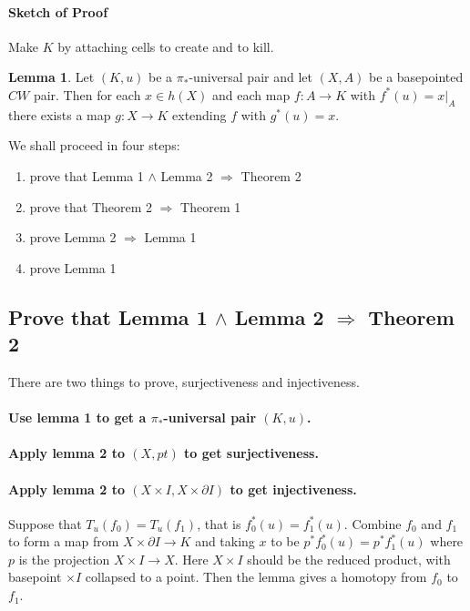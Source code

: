 \documentclass[11pt, oneside]{article}   	%
\theoremstyle{definition}
\newtheorem{lem}{Lemma}
\begin{document}
\paragraph{Sketch of Proof}

Make $K$ by attaching cells to create and to kill.

\begin{lem}
	Let $(K, u)$ be a $\pi_*$-universal pair and let $(X, A)$ be a basepointed $CW$ pair. Then for each $x\in h(X)$ and each map $f: A\to K$ with $f^*(u)=x|_A$ there exists a map $g:X\to K$ extending $f$ with $g^*(u)=x$.
\end{lem}

We shall proceed in four steps:
\begin{enumerate}[(1)]
	\item prove that Lemma 1 $\land$ Lemma 2 $\Rightarrow$ Theorem 2
	\item prove that Theorem 2 $\Rightarrow$ Theorem 1
	\item prove Lemma 2 $\Rightarrow$ Lemma 1
	\item prove Lemma 1
\end{enumerate}

\subsection{Prove that Lemma 1 $\land$ Lemma 2 $\Rightarrow$ Theorem 2}

There are two things to prove, surjectiveness and injectiveness.

\paragraph {Use lemma 1 to get a $\pi_*$-universal pair $(K,u)$.}

\paragraph {Apply lemma 2 to $(X, pt)$ to get surjectiveness.}

\paragraph {Apply lemma 2 to $(X\times I, X\times \partial I)$ to get injectiveness.}

Suppose that $T_u(f_0)=T_u(f_1)$, that is $f^*_0(u)=f^*_1(u)$. Combine $f_0$ and $f_1$ to form a map from $X\times \partial I\to K$ and taking $x$ to be $p^*f_0^*(u)=p^*f_1^*(u)$ where $p$ is the projection $X\times I\to X$. Here $X\times I$ should be the reduced product, with basepoint $\times I$ collapsed to a point. Then the lemma gives a homotopy from $f_0$ to $f_1$.
\end{document}
